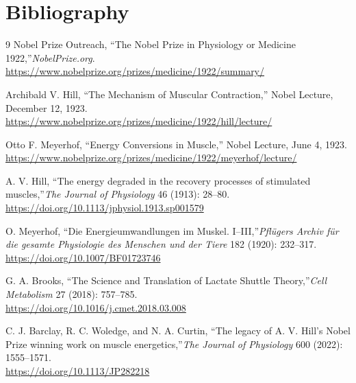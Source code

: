 \section{Bibliography}

\begin{thebibliography}{9}
Nobel Prize Outreach, ``The Nobel Prize in Physiology or Medicine 1922,''\emph{NobelPrize.org}.\\
\url{https://www.nobelprize.org/prizes/medicine/1922/summary/}

Archibald V. Hill, ``The Mechanism of Muscular Contraction,'' Nobel Lecture, December 12, 1923.\\
\url{https://www.nobelprize.org/prizes/medicine/1922/hill/lecture/}

Otto F. Meyerhof, ``Energy Conversions in Muscle,'' Nobel Lecture, June 4, 1923.\\
\url{https://www.nobelprize.org/prizes/medicine/1922/meyerhof/lecture/}

A. V. Hill, ``The energy degraded in the recovery processes of stimulated muscles,''\emph{The Journal of Physiology} 46 (1913): 28--80.\\
\url{https://doi.org/10.1113/jphysiol.1913.sp001579}

O. Meyerhof, ``Die Energieumwandlungen im Muskel. I--III,''\emph{Pflügers Archiv für die gesamte Physiologie des Menschen und der Tiere} 182 (1920): 232--317.\\
\url{https://doi.org/10.1007/BF01723746}

G. A. Brooks, ``The Science and Translation of Lactate Shuttle Theory,''\emph{Cell Metabolism} 27 (2018): 757--785.\\
\url{https://doi.org/10.1016/j.cmet.2018.03.008}

C. J. Barclay, R. C. Woledge, and N. A. Curtin, ``The legacy of A. V. Hill's Nobel Prize winning work on muscle energetics,''\emph{The Journal of Physiology} 600 (2022): 1555--1571.\\
\url{https://doi.org/10.1113/JP282218}
\end{thebibliography}
